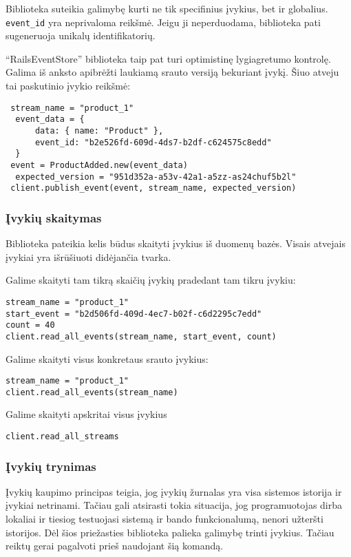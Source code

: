 Biblioteka suteikia galimybę kurti ne tik specifinius įvykius, bet ir globalius. \lstinline|event_id| yra neprivaloma reikšmė. Jeigu ji neperduodama, biblioteka pati sugeneruoja unikalų identifikatorių.

``RailsEventStore'' biblioteka taip pat turi optimistinę lygiagretumo kontrolę. Galima iš anksto apibrėžti laukiamą srauto versiją bekuriant įvykį. Šiuo atveju tai paskutinio įvykio reikšmė:

\begin{lstlisting}[]
 stream_name = "product_1" 
  event_data = { 
      data: { name: "Product" }, 
      event_id: "b2e526fd-609d-4ds7-b2df-c624575c8edd" 
  }
 event = ProductAdded.new(event_data) 
  expected_version = "951d352a-a53v-42a1-a5zz-as24chuf5b2l"
 client.publish_event(event, stream_name, expected_version)
\end{lstlisting}

\subsubsection{Įvykių skaitymas}

Biblioteka pateikia kelis būdus skaityti įvykius iš duomenų bazės. Visais atvejais įvykiai yra išrūšiuoti didėjančia tvarka.

Galime skaityti tam tikrą skaičių įvykių pradedant tam tikru įvykiu:

\begin{lstlisting}[]
stream_name = "product_1" 
start_event = "b2d506fd-409d-4ec7-b02f-c6d2295c7edd"
count = 40
client.read_all_events(stream_name, start_event, count)
\end{lstlisting}

Galime skaityti visus konkretaus srauto įvykius:

\begin{lstlisting}[]
stream_name = "product_1" 
client.read_all_events(stream_name)
\end{lstlisting}

Galime skaityti apskritai visus įvykius

\begin{lstlisting}[]
client.read_all_streams
\end{lstlisting}

\subsubsection{Įvykių trynimas}

Įvykių kaupimo principas teigia, jog įvykių žurnalas yra visa sistemos istorija ir įvykiai netrinami. Tačiau gali atsirasti tokia situacija, jog programuotojas dirba lokaliai ir tiesiog testuojasi sistemą ir bando funkcionalumą, nenori užteršti istorijos. Dėl šios priežasties biblioteka palieka galimybę trinti įvykius. Tačiau reiktų gerai pagalvoti prieš naudojant šią komandą.


